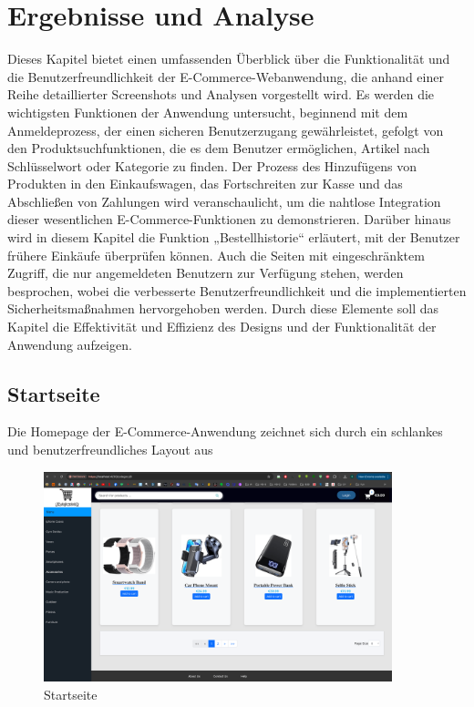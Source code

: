 \chapter{Ergebnisse und Analyse}

Dieses Kapitel bietet einen umfassenden Überblick über die Funktionalität und die Benutzerfreundlichkeit der E-Commerce-Webanwendung, die anhand einer Reihe detaillierter Screenshots und Analysen vorgestellt wird. Es werden die wichtigsten Funktionen der Anwendung untersucht, beginnend mit dem Anmeldeprozess, der einen sicheren Benutzerzugang gewährleistet, gefolgt von den Produktsuchfunktionen, die es dem Benutzer ermöglichen, Artikel nach Schlüsselwort oder Kategorie zu finden. Der Prozess des Hinzufügens von Produkten in den Einkaufswagen, das Fortschreiten zur Kasse und das Abschließen von Zahlungen wird veranschaulicht, um die nahtlose Integration dieser wesentlichen E-Commerce-Funktionen zu demonstrieren. Darüber hinaus wird in diesem Kapitel die Funktion „Bestellhistorie“ erläutert, mit der Benutzer frühere Einkäufe überprüfen können. Auch die Seiten mit eingeschränktem Zugriff, die nur angemeldeten Benutzern zur Verfügung stehen, werden besprochen, wobei die verbesserte Benutzerfreundlichkeit und die implementierten Sicherheitsmaßnahmen hervorgehoben werden. Durch diese Elemente soll das Kapitel die Effektivität und Effizienz des Designs und der Funktionalität der Anwendung aufzeigen.

\section{Startseite}
Die Homepage der E-Commerce-Anwendung zeichnet sich durch ein schlankes und benutzerfreundliches Layout aus

\begin{figure}[H]  
	\centering %
	\includegraphics[width=0.9\textwidth]{Images/Home-Page.png} 
	\caption{Startseite} 
	\label{fig:sample-image} 
\end{figure}

